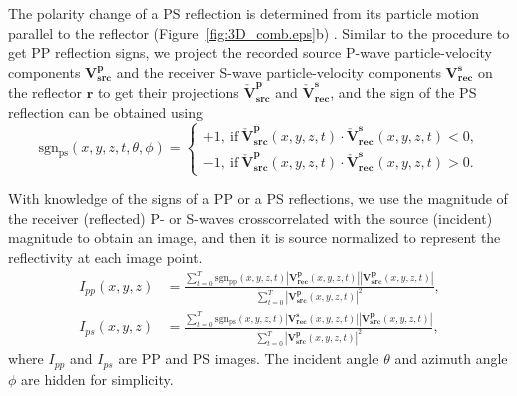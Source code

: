 \documentclass[manuscript,ulem,graphix,revised]{geophysics}
\begin{document}
The polarity change of a PS reflection is determined from its particle motion parallel to the reflector (Figure~\ref{fig:3D_comb.eps}b) \citep{aki80}. Similar to the procedure to get PP reflection signs, we project the recorded source P-wave particle-velocity components $\mathbf{V}^{\mathbf{p}}_{\mathbf{src}}$ and the receiver S-wave particle-velocity components $\mathbf{V}^{\mathbf{s}}_{\mathbf{rec}}$ on the reflector $\mathbf{r}$ to get their projections $\check{\mathbf{V}}^{\mathbf{p}}_{\mathbf{src}}$ and $\check{\mathbf{V}}^{\mathbf{s}}_{\mathbf{rec}}$, and the sign of the PS reflection can be obtained using
\begin{equation}
\mathrm{sgn_{ps}}(x,y,z,t,\theta,\phi)=\begin{cases}
 +1, \ \mathrm{if} \ \check{\mathbf{V}}^{\mathbf{p}}_{\mathbf{src}}(x,y,z,t) \cdot \check{\mathbf{V}}^{\mathbf{s}}_{\mathbf{rec}}(x,y,z,t)<0, \\ 
 -1, \ \mathrm{if} \ \check{\mathbf{V}}^{\mathbf{p}}_{\mathbf{src}}(x,y,z,t) \cdot \check{\mathbf{V}}^{\mathbf{s}}_{\mathbf{rec}}(x,y,z,t)>0 .
\end{cases}
\label{eqn:sgn_ps}
\end{equation}

With knowledge of the signs of a PP or a PS reflections, we use the magnitude of the receiver (reflected) P- or S-waves crosscorrelated with the source (incident) magnitude to obtain an image, and then it is source normalized to represent the reflectivity \citep{sheriff95} at each image point.
\begin{equation}
\begin{aligned}
I_{pp}(x,y,z)&=\frac{\sum_{t=0}^{T}\mathrm{sgn_{pp}}(x,y,z,t)|\mathbf{V^p_{rec}}(x,y,z,t)||\mathbf{V^p_{src}}(x,y,z,t)|}
                    {\sum_{t=0}^{T}|\mathbf{V^p_{src}}(x,y,z,t)|^2 },\\
I_{ps}(x,y,z)&=\frac{\sum_{t=0}^{T}\mathrm{sgn_{ps}}(x,y,z,t)|\mathbf{V^s_{rec}}(x,y,z,t)||\mathbf{V^p_{src}}(x,y,z,t)|}
                    {\sum_{t=0}^{T}|\mathbf{V^p_{src}}(x,y,z,t)|^2 },
\end{aligned}
\label{eqn:reflectivity}
\end{equation}
where $I_{pp}$ and $I_{ps}$ are PP and PS images. The incident angle $\theta$ and azimuth angle $\phi$ are hidden for simplicity.
\end{document}
